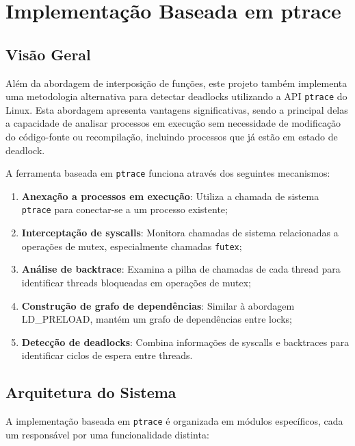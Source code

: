 \section{Implementação Baseada em ptrace}\label{sec:ptrace}

\subsection{Visão Geral}

Além da abordagem de interposição de funções, este projeto também implementa uma metodologia alternativa para detectar deadlocks utilizando a API \texttt{ptrace} do Linux. Esta abordagem apresenta vantagens significativas, sendo a principal delas a capacidade de analisar processos em execução sem necessidade de modificação do código-fonte ou recompilação, incluindo processos que já estão em estado de deadlock.

A ferramenta baseada em \texttt{ptrace} funciona através dos seguintes mecanismos:

\begin{enumerate}
    \item \textbf{Anexação a processos em execução}: Utiliza a chamada de sistema \texttt{ptrace} para conectar-se a um processo existente;
    \item \textbf{Interceptação de syscalls}: Monitora chamadas de sistema relacionadas a operações de mutex, especialmente chamadas \texttt{futex};
    \item \textbf{Análise de backtrace}: Examina a pilha de chamadas de cada thread para identificar threads bloqueadas em operações de mutex;
    \item \textbf{Construção de grafo de dependências}: Similar à abordagem LD\_PRELOAD, mantém um grafo de dependências entre locks;
    \item \textbf{Detecção de deadlocks}: Combina informações de syscalls e backtraces para identificar ciclos de espera entre threads.
\end{enumerate}

\subsection{Arquitetura do Sistema}

A implementação baseada em \texttt{ptrace} é organizada em módulos específicos, cada um responsável por uma funcionalidade distinta:

